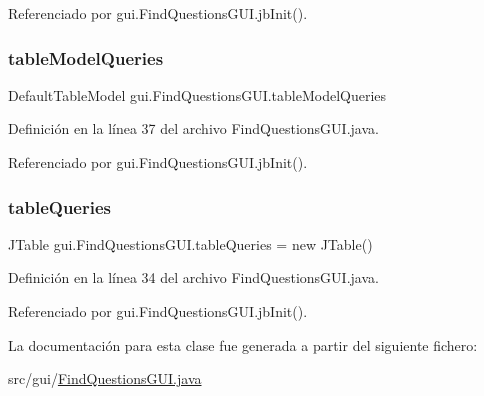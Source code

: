 Referenciado por gui.\+Find\+Questions\+G\+U\+I.\+jb\+Init().

\mbox{\label{classgui_1_1FindQuestionsGUI_aec87a2a23f53df34886c52c6bb405666}} 
\subsubsection{\texorpdfstring{tableModelQueries}{tableModelQueries}}
{\footnotesize\ttfamily Default\+Table\+Model gui.\+Find\+Questions\+G\+U\+I.\+table\+Model\+Queries\hspace{0.3cm}{\ttfamily [private]}}



Definición en la línea 37 del archivo Find\+Questions\+G\+U\+I.\+java.



Referenciado por gui.\+Find\+Questions\+G\+U\+I.\+jb\+Init().

\mbox{\label{classgui_1_1FindQuestionsGUI_a593cb17bb67700c97f5cf1dcd636526f}} 
\subsubsection{\texorpdfstring{tableQueries}{tableQueries}}
{\footnotesize\ttfamily J\+Table gui.\+Find\+Questions\+G\+U\+I.\+table\+Queries = new J\+Table()\hspace{0.3cm}{\ttfamily [private]}}



Definición en la línea 34 del archivo Find\+Questions\+G\+U\+I.\+java.



Referenciado por gui.\+Find\+Questions\+G\+U\+I.\+jb\+Init().



La documentación para esta clase fue generada a partir del siguiente fichero\+:\begin{DoxyCompactItemize}
\item 
src/gui/\mbox{\hyperlink{FindQuestionsGUI_8java}{Find\+Questions\+G\+U\+I.\+java}}\end{DoxyCompactItemize}
